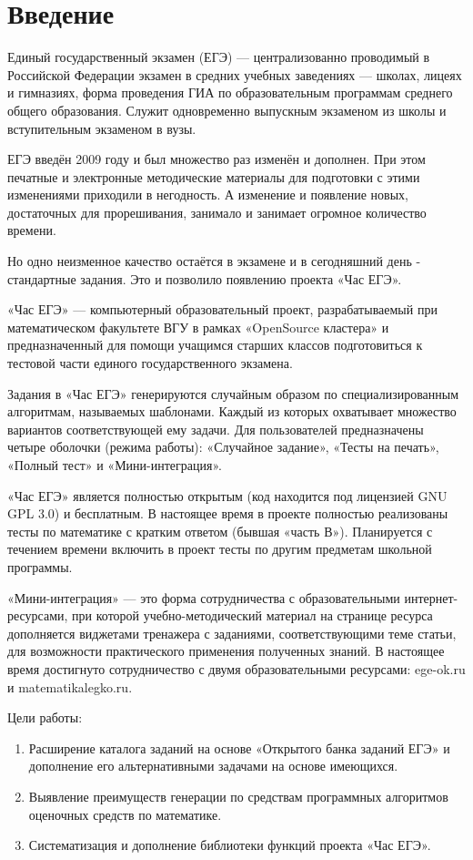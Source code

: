 
\section*{Введение}
Единый государственный экзамен (ЕГЭ) --- централизованно проводимый в Российской Федерации экзамен в средних учебных заведениях — школах, лицеях и гимназиях,
форма проведения ГИА по образовательным программам среднего общего образования.
Служит одновременно выпускным экзаменом из школы и вступительным экзаменом в вузы.

ЕГЭ введён 2009 году и был множество раз изменён и дополнен. 
При этом печатные и электронные методические материалы для подготовки с этими изменениями приходили в негодность. А изменение и появление новых, достаточных для прорешивания, занимало и занимает огромное количество времени. 

Но одно неизменное качество остаётся в экзамене и в сегодняшний день - стандартные задания. 
Это и позволило появлению проекта «Час ЕГЭ».

«Час ЕГЭ» — компьютерный образовательный проект, разрабатываемый при математическом факультете ВГУ в рамках «OpenSource кластера» и предназначенный для помощи учащимся старших классов подготовиться к тестовой части единого государственного экзамена.

Задания в «Час ЕГЭ» генерируются случайным образом по специализированным алгоритмам, называемых шаблонами.
Каждый из которых охватывает множество вариантов соответствующей ему задачи. Для пользователей предназначены четыре оболочки (режима работы): «Случайное задание», «Тесты на печать», «Полный тест» и «Мини-интеграция».

«Час ЕГЭ» является полностью открытым (код находится под лицензией GNU GPL 3.0) и бесплатным.
В настоящее время в проекте полностью реализованы тесты по математике с кратким ответом (бывшая «часть В»).
Планируется с течением времени включить в проект тесты по другим предметам школьной программы.

«Мини-интеграция» — это форма сотрудничества с образовательными интернет-ресурсами, при которой учебно-методический материал на странице ресурса дополняется виджетами тренажера с заданиями, соответствующими теме статьи, для возможности практического применения полученных знаний.
В настоящее время достигнуто сотрудничество с двумя образовательными ресурсами: ege-ok.ru и matematikalegko.ru.

Цели работы:
\begin{enumerate}
    \item Расширение каталога заданий на основе «Открытого банка заданий ЕГЭ» и дополнение его альтернативными задачами на основе имеющихся.
    \item Выявление преимуществ генерации по средствам программных алгоритмов оценочных средств по математике.
    \item Систематизация и дополнение библиотеки функций проекта «Час ЕГЭ».
\end{enumerate}
